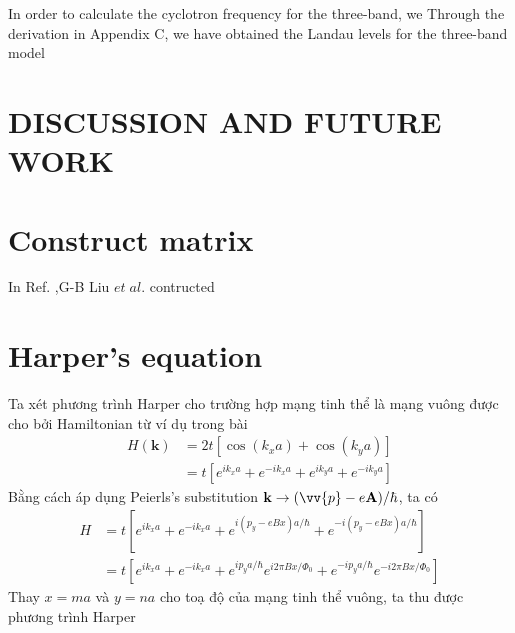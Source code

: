 \documentclass{report}
\begin{document}
In order to calculate the cyclotron frequency for the three-band, we  Through the derivation in Appendix C, we have obtained the Landau levels for the three-band model



\chapter{DISCUSSION AND FUTURE WORK}






\nocite{*}
\renewcommand{\bibname}{REFERENCES}


\appendix
\renewcommand{\chaptername}{Appendix}
\chapter{Construct matrix}
In Ref. \cite{PhysRevB.88.085433},G-B Liu $et \; al$. contructed


\chapter{Harper's equation} \label{appendix b}
Ta xét phương trình Harper cho trường hợp mạng tinh thể là mạng vuông được cho bởi Hamiltonian từ ví dụ trong bài \cite{yalcin_2019}
\begin{equation}
	\begin{aligned}
		H(\mathbf{k})
		 & = 2 t \left[\cos(k_{x} a) + \cos(k_{y} a)\right]                               \\
		 & = t \left[ e^{ik_{x} a} + e^{-ik_{x} a} + e^{ik_{y} a} + e^{-ik_{y} a} \right]
	\end{aligned}
\end{equation}
Bằng cách áp dụng Peierls's substitution $\mathbf{k} \rightarrow (\vv{p} - e \mathbf{A}) / \hbar$, ta có
\begin{equation}
	\begin{aligned}
		H & = t \left[ e^{ik_{x} a} + e^{-ik_{x} a} + e^{i (p_{y} - e Bx) a/\hbar} + e^{-i (p_{y} - e Bx) a/\hbar} \right]                                    \\
		  & = t \left[ e^{ik_{x} a} + e^{-ik_{x} a} + e^{i p_{y} a/\hbar} e^{i 2 \pi Bx / \Phi_{0}} + e^{-i p_{y} a/\hbar} e^{-i 2 \pi Bx / \Phi_{0}} \right]
	\end{aligned}
\end{equation}
Thay $x = ma$ và $y = na$ cho toạ độ của mạng tinh thể vuông, ta thu được phương trình Harper
\end{document}
